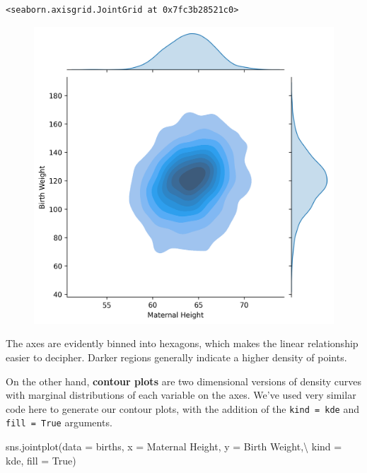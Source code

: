 \documentclass[
  letterpaper,
  DIV=11,
  numbers=noendperiod]{scrreprt}
\newenvironment{Shaded}{\begin{snugshade}}{\end{snugshade}}
\newcommand{\NormalTok}[1]{\textcolor[rgb]{0.00,0.23,0.31}{#1}}
\newcommand{\OperatorTok}[1]{\textcolor[rgb]{0.37,0.37,0.37}{#1}}
\newcommand{\StringTok}[1]{\textcolor[rgb]{0.13,0.47,0.30}{#1}}
\newcommand{\VariableTok}[1]{\textcolor[rgb]{0.07,0.07,0.07}{#1}}
\begin{document}
\begin{verbatim}
<seaborn.axisgrid.JointGrid at 0x7fc3b28521c0>
\end{verbatim}

\begin{figure}[H]

{\centering \includegraphics{visualization_2/visualization_2_files/figure-pdf/cell-11-output-2.png}

}

\end{figure}

The axes are evidently binned into hexagons, which makes the linear
relationship easier to decipher. Darker regions generally indicate a
higher density of points.

On the other hand, \textbf{contour plots} are two dimensional versions
of density curves with marginal distributions of each variable on the
axes. We've used very similar code here to generate our contour plots,
with the addition of the
\texttt{kind\ =\ \textquotesingle{}kde\textquotesingle{}} and
\texttt{fill\ =\ True} arguments.

\begin{Shaded}
\begin{Highlighting}[]
\NormalTok{sns.jointplot(data }\OperatorTok{=}\NormalTok{ births, x }\OperatorTok{=} \StringTok{\textquotesingle{}Maternal Height\textquotesingle{}}\NormalTok{, y }\OperatorTok{=} \StringTok{\textquotesingle{}Birth Weight\textquotesingle{}}\NormalTok{,}\OperatorTok{\textbackslash{}}
\NormalTok{              kind }\OperatorTok{=} \StringTok{\textquotesingle{}kde\textquotesingle{}}\NormalTok{, fill }\OperatorTok{=} \VariableTok{True}\NormalTok{)}
\end{Highlighting}
\end{Shaded}
\end{document}
